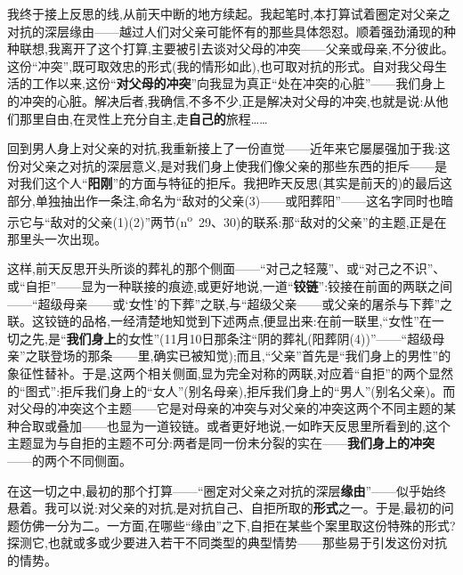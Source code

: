 我终于接上反思的线,从前天中断的地方续起。我起笔时,本打算试着圈定对父亲之对抗的深层缘由——越过人们对父亲可能怀有的那些具体怨怼。顺着强劲涌现的种种联想,我离开了这个打算,主要被引去谈对父母的冲突——父亲或母亲,不分彼此。这份“冲突”,既可取效忠的形式(我的情形如此),也可取对抗的形式。自对我父母生活的工作以来,这份“\textbf{对父母的冲突}”向我显为真正\dmark{}“处在冲突的心脏”——我们身上的冲突的心脏。解决后者,我确信,不多不少,正是解决对父母的冲突,也就是说:从他们那里自由,在灵性上充分自主,走\textbf{自己的}旅程……

回到男人身上对父亲的对抗,我重新接上了一份直觉——近年来它屡屡强加于我:这份对父亲之对抗的深层意义,是对我们身上使我们像父亲的那些东西的拒斥——是对我们这个人“\textbf{阳刚}”的方面与特征的拒斥。我把昨天反思(其实是前天的)的最后这部分,单独抽出作一条注,命名为“敌对的父亲(3)——或阳葬阳”——这名字同时也暗示它与“敌对的父亲(1)(2)”两节(n\textsuperscript{o}~29、30)的联系:那“敌对的父亲”的主题,正是在那里头一次出现。

这样,前天反思开头所谈的葬礼的那个侧面——“对己之轻蔑”、或“对己之不识”、或“自拒”——显为一种联接的痕迹,或更好地说,一道“\textbf{铰链}”:铰接在前面的两联之间——“超级母亲——或‘女性’的下葬”之联,与“超级父亲——或父亲的屠杀与下葬”之联。这铰链的品格,一经清楚地知觉到下述两点,便显出来:在前一联里,“女性”在一切之先,是“\textbf{我们身上}的女性”(11月10日那条注“阴的葬礼(阳葬阴(4))”——“超级母亲”之联登场的那条——里,确实已被知觉);而且,“父亲”首先是“我们身上的男性”的象征性替补。于是,这两个相关侧面,显为完全对称的两联,对应着“自拒”的两个显然的“图式”:拒斥我们身上的“女人”(别名母亲),拒斥我们身上的“男人”(别名父亲)。而对父母的冲突这个主题\dmark{}——它是对母亲的冲突与对父亲的冲突这两个不同主题的某种合取或叠加——也显为一道铰链。或者更好地说,一如昨天反思里所看到的,这个主题显为与自拒的主题不可分:两者是同一份未分裂的实在——\textbf{我们身上的冲突}——的两个不同侧面。

在这一切之中,最初的那个打算——“圈定对父亲之对抗的深层\textbf{缘由}”——似乎始终悬着。我可以说:对父亲的对抗,是对抗自己、自拒所取的\textbf{形式}之一。于是,最初的问题仿佛一分为二。一方面,在哪些“缘由”之下,自拒在某些个案里取这份特殊的形式?探测它,也就或多或少要进入若干不同类型的典型情势——那些易于引发这份对抗的情势。

